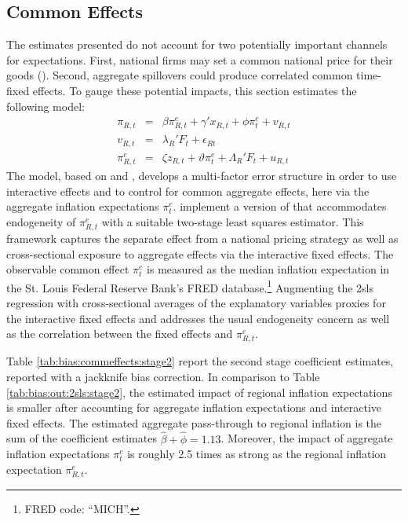 \documentclass[12pt]{article}
\begin{document}
\subsection{Common Effects}

The estimates presented do not account for two potentially important channels for expectations.  First, national firms may set a common national price for their goods (\cite{DellaVignaGentzkow:QJE2019}).  Second, aggregate spillovers could produce correlated common time-fixed effects.  To gauge these potential impacts, this section estimates the following model:
\begin{eqnarray*}
\pi_{R,t} &=& \beta \pi^e_{R,t} + \gamma' x_{R,t} + \phi\pi^e_t +  v_{R,t}\\
v_{R,t} &=& \lambda_R'F_t+\epsilon_{Rt}\\
\pi^e_{R,t} &=& \zeta z_{R,t} + \vartheta \pi^e_t + \Lambda_R'F_t + u_{R,t}
\end{eqnarray*}
The model, based on \cite{Bai:2009} and \cite{Pesaran:2006}, develops a multi-factor error structure in order to use interactive effects and to control for common aggregate effects, here via the aggregate inflation expectations $\pi^e_t$.  \cite{HardingLamarche:EL} implement a version of \cite{Pesaran:2006} that accommodates endogeneity of $\pi^e_{R,t}$ with a suitable two-stage least squares estimator.  This framework captures the separate effect from a national pricing strategy as well as cross-sectional exposure to aggregate effects via the interactive fixed effects.  The observable common effect $\pi^e_t$ is measured as the median inflation expectation in the St. Louis Federal Reserve Bank's FRED database.\footnote{FRED code: ``MICH''.}  Augmenting the 2sls regression with cross-sectional averages of the explanatory variables proxies for the interactive fixed effects and addresses the usual endogeneity concern as well as the correlation between the fixed effects and $\pi^e_{R,t}$.

Table \ref{tab:bias:commeffects:stage2} report the second stage coefficient estimates, reported with a jackknife bias correction.  In comparison to Table \ref{tab:bias:out:2sls:stage2}, the estimated impact of regional inflation expectations is smaller after accounting for aggregate inflation expectations and interactive fixed effects.  The estimated aggregate pass-through to regional inflation is the sum of the coefficient estimates $\hat{\beta}+\hat{\phi} = 1.13$.  Moreover, the impact of aggregate inflation expectations $\pi^e_t$ is roughly 2.5 times as strong as the regional inflation expectation $\pi^e_{R,t}$.  
\end{document}
